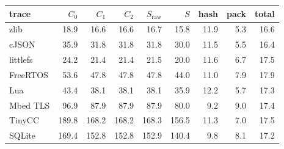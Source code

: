 \begin{tabular}{@{}lrrrrrrrr@{}}
\toprule
trace & $C_0$ & $C_1$ & $C_2$ & $S_{\mathrm{raw}}$ & $S$ & hash & pack & total \\
\midrule
zlib & 18.9 & 16.6 & 16.6 & 16.7 & 15.8 & 11.9 & 5.3 & 16.6 \\
cJSON & 35.9 & 31.8 & 31.8 & 31.8 & 30.0 & 11.5 & 5.5 & 16.4 \\
littlefs & 24.2 & 21.4 & 21.4 & 21.5 & 20.0 & 11.6 & 6.7 & 17.5 \\
FreeRTOS & 53.6 & 47.8 & 47.8 & 47.8 & 44.0 & 11.0 & 7.9 & 17.9 \\
Lua & 43.4 & 38.1 & 38.1 & 38.1 & 35.9 & 12.2 & 5.7 & 17.3 \\
Mbed TLS & 96.9 & 87.9 & 87.9 & 87.9 & 80.0 & 9.2 & 9.0 & 17.4 \\
TinyCC & 189.8 & 168.2 & 168.2 & 168.3 & 156.5 & 11.3 & 7.0 & 17.5 \\
SQLite & 169.4 & 152.8 & 152.8 & 152.9 & 140.4 & 9.8 & 8.1 & 17.2 \\
\bottomrule
\end{tabular}
